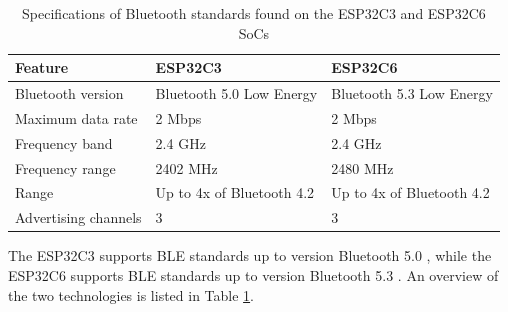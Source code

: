 \begin{table}[H]
    \centering
    \begin{tabular}{|l|l|l|}
        \hline
        \textbf{Feature} & \textbf{ESP32C3} & \textbf{ESP32C6} \\\hline
        Bluetooth version & Bluetooth 5.0 Low Energy & Bluetooth 5.3 Low Energy \\\hline
        Maximum data rate & 2 Mbps & 2 Mbps \\\hline
        Frequency band & 2.4 GHz & 2.4 GHz \\\hline
        Frequency range & 2402 MHz & 2480 MHz \\\hline
        Range & Up to 4x of Bluetooth 4.2 & Up to 4x of Bluetooth 4.2 \\\hline
        Advertising channels & 3 & 3 \\\hline
    \end{tabular}
    \vspace{\ftspace}
    \caption{Specifications of Bluetooth standards found on the ESP32C3 and ESP32C6 SoCs \citep{noauthor_bluetooth_2024-1, noauthor_bluetooth_2024-2}}
    \label{tab:esp_bluetooth}
\end{table}
The ESP32C3 supports BLE standards up to version Bluetooth 5.0 \citep{espressif_systems_esp32-c3_2024, seeed_studio_seeed_2024-2, noauthor_bluetooth_2024-2}, while the ESP32C6 supports BLE standards up to version Bluetooth 5.3 \citep{espressif_systems_esp32-c6_2024, seeed_studio_seeed_2024-1, noauthor_bluetooth_2024-1}. An overview of the two technologies is listed in Table \ref{tab:esp_bluetooth}.\\

